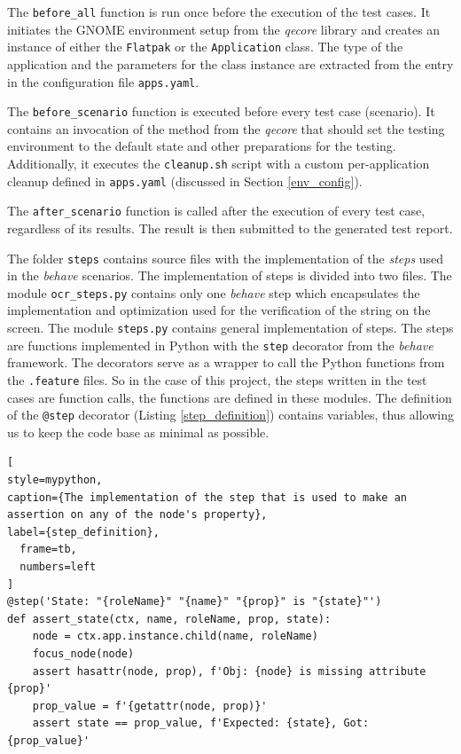 The \texttt{before\_all} function is run once before the execution of the test cases. It initiates the GNOME environment setup from the \textit{qecore} library and creates an instance of either the \texttt{Flatpak} or the \texttt{Application} class. The type of the application and the parameters for the class instance are extracted from the entry in the configuration file \texttt{apps.yaml}. 

The \texttt{before\_scenario} function is executed before every test case (scenario). It contains an invocation of the method from the \textit{qecore} that should set the testing environment to the default state and other preparations for the testing. Additionally, it executes the \texttt{cleanup.sh} script with a custom per-application cleanup defined in \texttt{apps.yaml} (discussed in Section \ref{env_config}). 

The \texttt{after\_scenario} function is called after the execution of every test case, regardless of its results. The result is then submitted to the generated test report.

The folder \texttt{steps} contains source files with the implementation of the \textit{steps} used in the \textit{behave} scenarios. The implementation of steps is divided into two files. The module \texttt{ocr\_steps.py} contains only one \textit{behave} step which encapsulates the implementation and optimization used for the verification of the string on the screen. The module \texttt{steps.py} contains general implementation of steps. The steps are functions implemented in Python with the \texttt{step} decorator from the \textit{behave} framework. The decorators serve as a wrapper to call the Python functions from the \texttt{.feature} files. So in the case of this project, the steps written in the test cases are function calls, the functions are defined in these modules. The definition of the \texttt{@step} decorator (Listing \ref{step_definition}) contains variables, thus allowing us to keep the code base as minimal as possible.

\begin{lstlisting}[
style=mypython,
caption={The implementation of the step that is used to make an assertion on any of the node's property},
label={step_definition},
  frame=tb,
  numbers=left
]
@step('State: "{roleName}" "{name}" "{prop}" is "{state}"')
def assert_state(ctx, name, roleName, prop, state):
    node = ctx.app.instance.child(name, roleName)
    focus_node(node)
    assert hasattr(node, prop), f'Obj: {node} is missing attribute {prop}'
    prop_value = f'{getattr(node, prop)}'
    assert state == prop_value, f'Expected: {state}, Got: {prop_value}'
\end{lstlisting}

